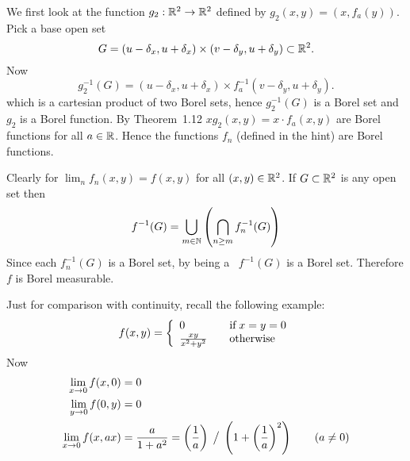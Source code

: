 \begin{enumerate}
\begin{itemize}
We first look at the function \(g_2:\mathbb{R}^2\to\mathbb{R}^2\) defined by
\(g_2(x,y) = (x,f_a(y))\).
Pick a base open set 
\begin{equation*}
G = (u-\delta_x,u+\delta_x)\times(v-\delta_y,u+\delta_y) \subset \mathbb{R}^2.
\end{equation*}
Now
\begin{equation*}
g_2^{-1}(G) = (u-\delta_x,u+\delta_x)\times f_a^{-1}(v-\delta_y,u+\delta_y).
\end{equation*}
which is a cartesian product of two Borel sets, hence
\(g_2^{-1}(G)\) is a Borel set and \(g_2\) is a Borel function.
By Theorem~1.12 \(xg_2(x,y) = x\cdot f_a(x,y)\) are Borel
functions for all \(a\in\mathbb{R}\).
Hence the functions \(f_n\) (defined in the hint) are Borel functions.

Clearly for \(\lim_n f_n(x,y) = f(x,y)\) for all \((x,y)\in\mathbb{R}^2\).
If \(G\subset \mathbb{R}^2\) is any open set then
\begin{equation*}
f^{-1}(G) = \bigcup_{m\in\mathbb{N}} \left(\bigcap_{n\geq m} f_n^{-1}(G)\right)
\end{equation*}
Since each \(f_n^{-1}(G)\) is a Borel set, 
by being a \salgebra\ \(f^{-1}(G)\) is a Borel set. 
Therefore $f$ is Borel measurable.


Just for comparison with continuity, recall the following example:
\begin{equation*}
f(x,y) = \left\{
\begin{array}{ll}
0 & \textnormal{if}\; x= y = 0 \\
\frac{xy}{x^2+y^2}  \quad & \textnormal{otherwise}
\end{array}\right.
\end{equation*}
Now 
\begin{align*}
\lim_{x\to 0} f(x,0) &= 0 \\
\lim_{y\to 0} f(0,y) &= 0 \\
\lim_{x\to 0} f(x,ax) &= \frac{a}{1+a^2} 
   = \left(\frac{1}{a}\right)\,
     \bigm/\,
     \left(1+\left(\frac{1}{a}\right)^2\right)
     \qquad (a\neq 0)
\end{align*}


\end{itemize}
\end{enumerate}
